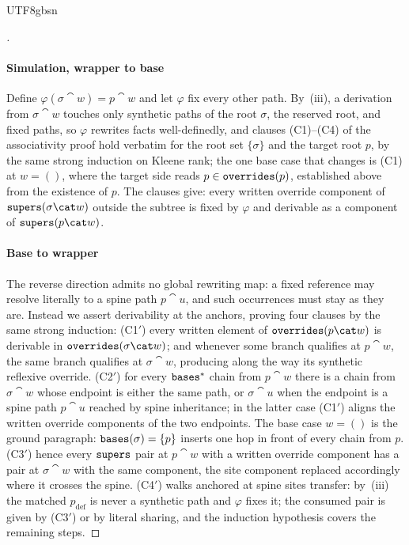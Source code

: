 \begin{CJK*}{UTF8}{gbsn}
\begin{proof}[]
  \paragraph{Simulation, wrapper to base}
  Define $\varphi(\sigma \cat w) = p \cat w$ and let $\varphi$ fix
  every other path. By~(iii), a derivation from $\sigma \cat w$
  touches only synthetic paths of the root $\sigma$, the reserved
  root, and fixed paths, so $\varphi$ rewrites facts
  well-definedly, and clauses (C1)--(C4) of the associativity proof
  hold verbatim for the root set $\{\sigma\}$ and the target root
  $p$, by the same strong induction on Kleene rank; the one base
  case that changes is (C1) at $w = ()$, where the target side
  reads $p \in \mathtt{overrides}(p)$, established above from the existence
  of $p$. The clauses give: every written override component of
  $\supers(\sigma \cat w)$ outside the subtree is fixed by
  $\varphi$ and derivable as a component of $\supers(p \cat w)$.

  \paragraph{Base to wrapper}
  The reverse direction admits no global rewriting map: a fixed
  reference may resolve literally to a spine path $p \cat u$, and
  such occurrences must stay as they are. Instead we assert
  derivability at the anchors, proving four clauses by the same
  strong induction: (C1$'$) every written element of
  $\overrides(p \cat w)$ is derivable in
  $\overrides(\sigma \cat w)$; and whenever some branch qualifies
  at $p \cat w$, the same branch qualifies at $\sigma \cat w$,
  producing along the way its synthetic reflexive override.
  (C2$'$) for every $\mathtt{bases}^*$ chain from $p \cat w$ there is a
  chain from $\sigma \cat w$ whose endpoint is either the same
  path, or $\sigma \cat u$ when the endpoint is a spine path
  $p \cat u$ reached by spine inheritance; in the latter case
  (C1$'$) aligns the written override components of the two
  endpoints. The base case $w = ()$ is the ground paragraph:
  $\mathtt{bases}(\sigma) = \{p\}$ inserts one hop in front of every chain
  from $p$. (C3$'$) hence every $\mathtt{supers}$ pair at $p \cat w$ with a
  written override component has a pair at $\sigma \cat w$ with the
  same component, the site component replaced accordingly where it
  crosses the spine. (C4$'$) walks anchored at spine sites
  transfer: by~(iii) the matched $p_{\mathrm{def}}$ is never a
  synthetic path and $\varphi$ fixes it; the consumed pair is given
  by (C3$'$) or by literal sharing, and the induction hypothesis
  covers the remaining steps.


\end{proof}
\end{CJK*}

